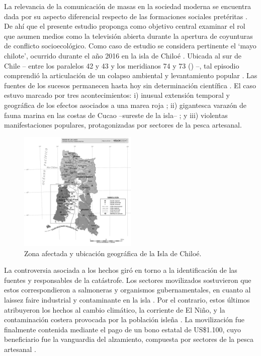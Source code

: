 \documentclass{textolivre}
\begin{document}
La relevancia de la comunicación de masas en la sociedad moderna se encuentra
dada por su aspecto diferencial respecto de las formaciones sociales pretéritas
\cite{Habermas2006}. De ahí que el presente estudio proponga como objetivo central
examinar el rol que asumen medios como la televisión abierta durante la apertura de
coyunturas de conflicto socioecológico. Como caso de estudio se considera pertinente el
‘mayo chilote’, ocurrido durante el año 2016 en la isla de Chiloé \cite{ValdebenitoAllendes2018}.
Ubicada al sur de Chile -- entre los paralelos 42 y 43 y los meridianos 74 y 73 ()
--, tal episodio comprendió la articulación de un colapso ambiental y levantamiento
popular \cite{cabello2018,roman2016}. Las fuentes de los
sucesos permanecen hasta hoy sin determinación científica \cite{buschmann2016,t13b}. 
El caso estuvo marcado por tres acontecimientos: i) inusual extensión
temporal y geográfica de los efectos asociados a una marea roja \cite{burrows2016}; ii)
gigantesca varazón de fauna marina en las costas de Cucao --sureste de la isla-- \cite{cnnchile2016b}; 
y iii) violentas manifestaciones populares, protagonizadas por sectores de
la pesca artesanal.

\begin{figure}[htbp]
 \centering
 \includegraphics[width=0.5\textwidth]{figure001.png}
 \caption{Zona afectada y ubicación geográfica de la Isla de Chiloé.}
 \label{fig01}
\end{figure}

La controversia asociada a los hechos giró en torno a la identificación de las
fuentes y responsables de la catástrofe. Los sectores movilizados sostuvieron que estos
correspondieron a salmoneras y organismos gubernamentales, en cuanto al laissez faire
industrial y contaminante en la isla \cite{agenciaefe}. Por el contrario, estos últimos
atribuyeron los hechos al cambio climático, la corriente de El Niño, y la contaminación
costera provocada por la población isleña \cite{infante2016,salmonexpert}. La
movilización fue finalmente contenida mediante el pago de un bono estatal de US\$1.100,
cuyo beneficiario fue la vanguardia del alzamiento, compuesta por sectores de la pesca
artesanal \cite{24horasb}.
\end{document}
